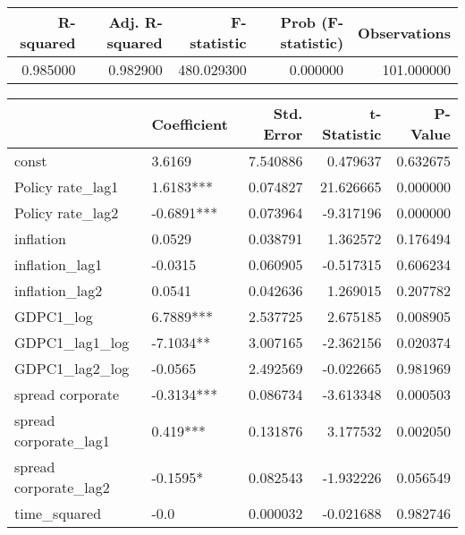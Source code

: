 \begin{tabular}{rrrrr}
\toprule
\textbf{R-squared} & \textbf{Adj. R-squared} & \textbf{F-statistic} & \textbf{Prob (F-statistic)} & \textbf{Observations} \\
\midrule
0.985000 & 0.982900 & 480.029300 & 0.000000 & 101.000000 \\
\bottomrule
\end{tabular}

\begin{tabular}{llrrr}
\toprule
 & \textbf{Coefficient} & \textbf{Std. Error} & \textbf{t-Statistic} & \textbf{P-Value} \\
\midrule
const & 3.6169 & 7.540886 & 0.479637 & 0.632675 \\
Policy rate_lag1 & 1.6183*** & 0.074827 & 21.626665 & 0.000000 \\
Policy rate_lag2 & -0.6891*** & 0.073964 & -9.317196 & 0.000000 \\
inflation & 0.0529 & 0.038791 & 1.362572 & 0.176494 \\
inflation_lag1 & -0.0315 & 0.060905 & -0.517315 & 0.606234 \\
inflation_lag2 & 0.0541 & 0.042636 & 1.269015 & 0.207782 \\
GDPC1_log & 6.7889*** & 2.537725 & 2.675185 & 0.008905 \\
GDPC1_lag1_log & -7.1034** & 3.007165 & -2.362156 & 0.020374 \\
GDPC1_lag2_log & -0.0565 & 2.492569 & -0.022665 & 0.981969 \\
spread corporate & -0.3134*** & 0.086734 & -3.613348 & 0.000503 \\
spread corporate_lag1 & 0.419*** & 0.131876 & 3.177532 & 0.002050 \\
spread corporate_lag2 & -0.1595* & 0.082543 & -1.932226 & 0.056549 \\
time_squared & -0.0 & 0.000032 & -0.021688 & 0.982746 \\
\bottomrule
\end{tabular}
